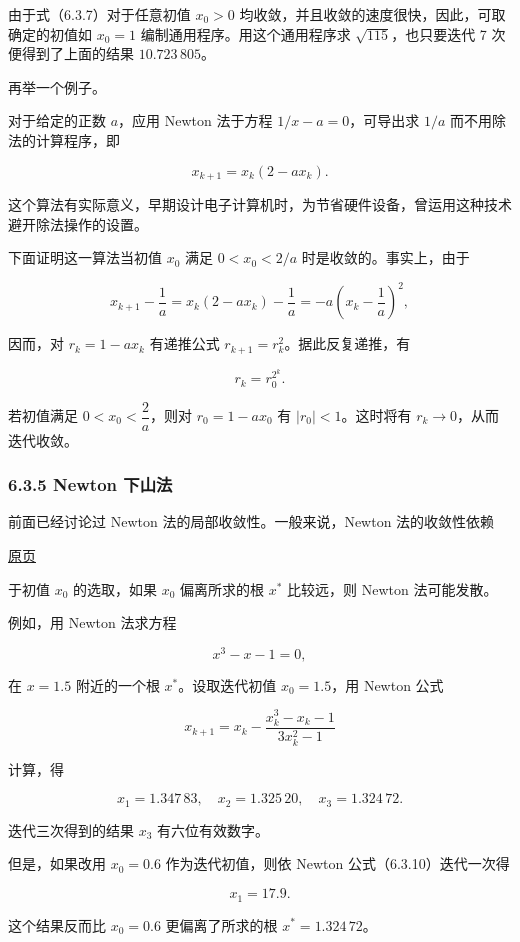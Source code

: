 \documentclass[
  10pt,
  fontset=fandol]{ctexart}
\begin{document}
由于式（6.3.7）对于任意初值 \(x_0>0\) 均收敛，并且收敛的速度很快，因此，可取确定的初值如 \(x_0=1\) 编制通用程序。用这个通用程序求 \(\sqrt{115}\)，也只要迭代 7 次便得到了上面的结果 \(10.723\,805\)。

再举一个例子。

对于给定的正数 \(a\)，应用 Newton 法于方程 \(1/x-a=0\)，可导出求 \(1/a\) 而不用除法的计算程序，即

\[
x_{k+1}=x_k(2-ax_k).
\]

这个算法有实际意义，早期设计电子计算机时，为节省硬件设备，曾运用这种技术避开除法操作的设置。

下面证明这一算法当初值 \(x_0\) 满足 \(0<x_0<2/a\) 时是收敛的。事实上，由于

\[
x_{k+1}-\frac{1}{a}=x_k(2-ax_k)-\frac{1}{a}=-a\left(x_k-\frac{1}{a}\right)^2,
\]

因而，对 \(r_k=1-ax_k\) 有递推公式 \(r_{k+1}=r_k^2\)。据此反复递推，有

\[
r_k=r_0^{2^k}.
\]

若初值满足 \(0<x_0<\dfrac{2}{a}\)，则对 \(r_0=1-ax_0\) 有 \(|r_0|<1\)。这时将有 \(r_k\to0\)，从而迭代收敛。

\subsubsection{6.3.5 Newton 下山法}\label{newton-ux4e0bux5c71ux6cd5}

前面已经讨论过 Newton 法的局部收敛性。一般来说，Newton 法的收敛性依赖

\href{../../source-images/pdf-167.jpeg}{原页}

于初值 \(x_0\) 的选取，如果 \(x_0\) 偏离所求的根 \(x^*\) 比较远，则 Newton 法可能发散。

例如，用 Newton 法求方程

\[
x^3-x-1=0,
\tag{6.3.9}
\]

在 \(x=1.5\) 附近的一个根 \(x^*\)。设取迭代初值 \(x_0=1.5\)，用 Newton 公式

\[
x_{k+1}=x_k-\frac{x_k^3-x_k-1}{3x_k^2-1}
\tag{6.3.10}
\]

计算，得

\[
x_1=1.347\,83,\quad x_2=1.325\,20,\quad x_3=1.324\,72.
\]

迭代三次得到的结果 \(x_3\) 有六位有效数字。

但是，如果改用 \(x_0=0.6\) 作为迭代初值，则依 Newton 公式（6.3.10）迭代一次得

\[
x_1=17.9.
\]

这个结果反而比 \(x_0=0.6\) 更偏离了所求的根 \(x^*=1.324\,72\)。
\end{document}
